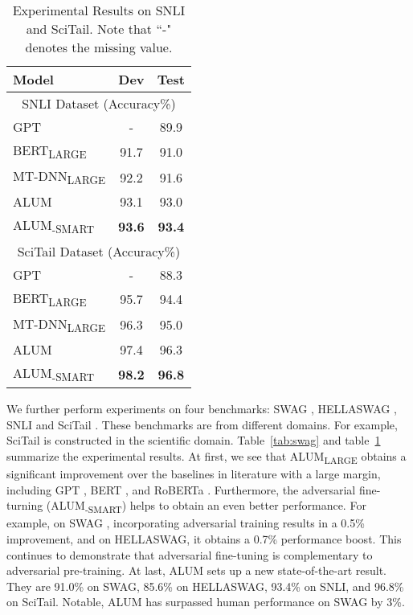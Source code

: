\documentclass[11pt,a4paper]{article}
\newcommand\DNAME{ALUM}
\newcommand{\alumrobertalarge}{ALUM}
\begin{document}
{\begin{table}[htb!]
\begin{center}
\begin{tabular}{@{\hskip1pt}l | c | c @{\hskip1pt}}
	   \bf Model &Dev& Test  \\ \hline 


		\multicolumn{3}{c}{ SNLI Dataset (Accuracy\%)}  \\ \hline 
		GPT \cite{gpt22019} &- & 89.9 \\ \hline
		\hline
		BERT\textsubscript{LARGE} &91.7& 91.0\\ \hline		
		MT-DNN\textsubscript{LARGE}\cite{liu2019mt-dnn}&92.2& 91.6\\ \hline		
		{\alumrobertalarge{}} &93.1& 93.0\\ \hline
\hline
		{\alumrobertalarge{}}\textsubscript{-SMART} &\textbf{93.6}& \textbf{93.4}\\ \hline
		\hline		
		\multicolumn{3}{c}{ SciTail Dataset (Accuracy\%)}  \\ \hline 	GPT \cite{gpt22019} &- &88.3 \\ \hline
		BERT\textsubscript{LARGE}\cite{liu2019mt-dnn} &95.7& 94.4\\ \hline		
		MT-DNN\textsubscript{LARGE}\cite{liu2019mt-dnn} &96.3& 95.0\\ \hline
		{\alumrobertalarge{}} &97.4 & 96.3\\ \hline
{\alumrobertalarge{}}\textsubscript{-SMART} & \textbf{98.2}&\textbf{96.8} \\
		
		\bottomrule
		\end{tabular}
	\end{center}
	\caption{Experimental Results on SNLI and SciTail. Note that ``-" denotes the missing value. 
	}
\label{tab:snli}
\end{table}

We further perform experiments on four benchmarks: SWAG \cite{zellers2018swag}, HELLASWAG \cite{zellers2019hellaswag}, SNLI \cite{snli2015} and SciTail \cite{scitail}. These benchmarks are from different domains. For example, SciTail is constructed in the scientific domain. Table~\ref{tab:swag} and table~\ref{tab:snli} summarize the experimental results. At first, we see that {\DNAME\textsubscript{LARGE}} obtains a significant improvement over the baselines in literature with a large margin, including GPT \cite{gpt22019}, BERT \cite{devlin2018bert}, and RoBERTa \cite{liu2019roberta}. Furthermore, the adversarial fine-turning ({\alumrobertalarge{}}\textsubscript{-SMART}) helps to obtain an even better performance. For example, on SWAG , incorporating adversarial training results in a 0.5\% improvement, and on HELLASWAG, it obtains a 0.7\% performance boost. This continues to demonstrate that adversarial fine-tuning is complementary to adversarial pre-training. At last, {\alumrobertalarge{}} sets up a new state-of-the-art result. They are 91.0\% on SWAG, 85.6\% on HELLASWAG, 93.4\% on SNLI, and 96.8\% on SciTail. Notable, {\alumrobertalarge{}} has surpassed human performance on SWAG by 3\%. 
} 
\end{document}
